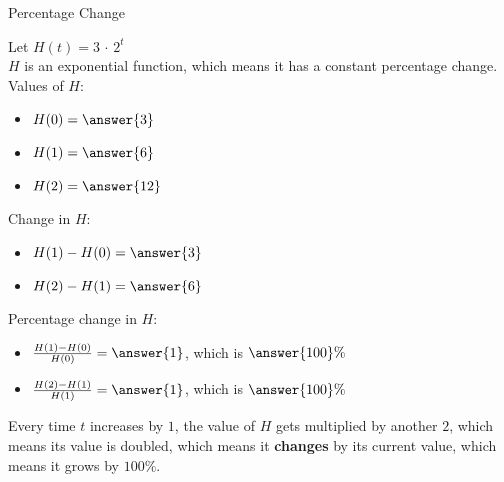 \documentclass{ximera}
\begin{document}
\begin{example} Percentage Change



Let $H(t) = 3 \, \cdot \, 2^t$ \\

$H$ is an exponential function, which means it has a constant percentage change. \\

Values of $H$:

\begin{itemize}
\item $H(0) = \answer{3}$

\item $H(1) = \answer{6}$

\item $H(2) = \answer{12}$
\end{itemize}



Change in $H$:

\begin{itemize}
\item $H(1) - H(0) = \answer{3}$

\item $H(2) - H(1) = \answer{6}$

\end{itemize}





Percentage change in $H$:

\begin{itemize}
\item $\frac{H(1) - H(0)}{H(0)} = \answer{1}$, which is $\answer{100}\%$

\item $\frac{H(2) - H(1)}{H(1)} = \answer{1}$, which is $\answer{100}\%$

\end{itemize}






\end{example}



Every time $t$ increases by $1$, the value of $H$ gets multiplied by another $2$, which means its value is doubled, which means it \textbf{changes} by its current value, which means it grows by $100\%$.
\end{document}
